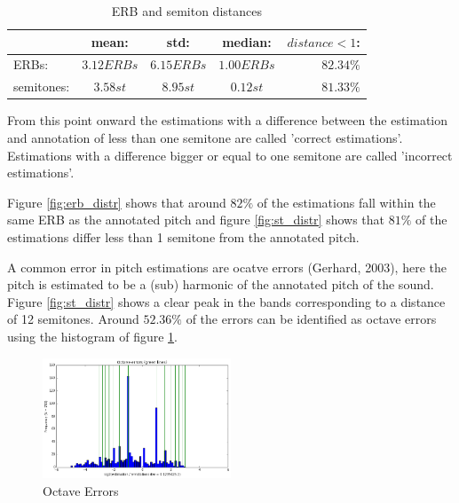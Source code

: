 \documentclass{proc}
\begin{document}
\begin{table}[h]
    \begin{center}
        \begin{tabular}{ | l | c | c | c || r |}
            \hline
                        &   mean:       &   std:        &   median:     &   $distance < 1$:\\  \hline
            ERBs:       &   $3.12ERBs$  &   $6.15ERBs$  &   $1.00ERBs$  &   $82.34\%$   \\  \hline
            semitones:  &   $3.58st$    &   $8.95st$    &   $0.12st$    &   $81.33\%$   \\  
            \hline
        \end{tabular}
        \caption{ERB and semiton distances}
        \label{table:ERB_st}
    \end{center}
\end{table}

From this point onward the estimations with a difference between the estimation and annotation of less than one semitone are called 'correct estimations'. Estimations with a difference bigger or equal to one semitone are called 'incorrect estimations'.

Figure \ref{fig:erb_distr} shows that around $82\%$ of the estimations fall within the same ERB as the annotated pitch and figure \ref{fig:st_distr} shows that $81\%$ of the estimations differ less than 1 semitone from the annotated pitch.

A common error in pitch estimations are ocatve errors (Gerhard, 2003), here the pitch is estimated to be a (sub) harmonic of the annotated pitch of the sound. Figure \ref{fig:st_distr} shows a clear peak in the bands corresponding to a distance of 12 semitones. Around $52.36\%$ of the errors can be identified as octave errors using the histogram of figure \ref{fig:octerr1}.

\begin{figure}
    \centering
    \includegraphics[width=0.5\textwidth]{img/octerr1.png}
    \caption{Octave Errors}
    \label{fig:octerr1}
\end{figure}
\end{document}
